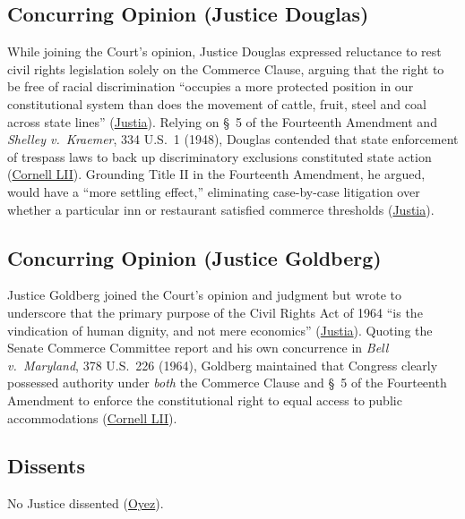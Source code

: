 \documentclass[12pt]{article}
\begin{document}
\subsection{Concurring Opinion (Justice Douglas)}
While joining the Court's opinion, Justice Douglas expressed reluctance to rest civil rights legislation solely on the Commerce Clause, arguing that the right to be free of racial discrimination ``occupies a more protected position in our constitutional system than does the movement of cattle, fruit, steel and coal across state lines'' (\href{https://supreme.justia.com/cases/federal/us/379/241/}{Justia}). Relying on \S~5 of the Fourteenth Amendment and \textit{Shelley v.\ Kraemer}, 334 U.S.\ 1 (1948), Douglas contended that state enforcement of trespass laws to back up discriminatory exclusions constituted state action (\href{https://www.law.cornell.edu/supremecourt/text/379/241}{Cornell LII}). Grounding Title II in the Fourteenth Amendment, he argued, would have a ``more settling effect,'' eliminating case-by-case litigation over whether a particular inn or restaurant satisfied commerce thresholds (\href{https://supreme.justia.com/cases/federal/us/379/241/}{Justia}).

\subsection{Concurring Opinion (Justice Goldberg)}
Justice Goldberg joined the Court's opinion and judgment but wrote to underscore that the primary purpose of the Civil Rights Act of 1964 ``is the vindication of human dignity, and not mere economics'' (\href{https://supreme.justia.com/cases/federal/us/379/241/}{Justia}). Quoting the Senate Commerce Committee report and his own concurrence in \textit{Bell v.\ Maryland}, 378 U.S.\ 226 (1964), Goldberg maintained that Congress clearly possessed authority under \textit{both} the Commerce Clause and \S~5 of the Fourteenth Amendment to enforce the constitutional right to equal access to public accommodations (\href{https://www.law.cornell.edu/supremecourt/text/379/241}{Cornell LII}).

\subsection{Dissents}
No Justice dissented (\href{https://www.oyez.org/cases/1964/515}{Oyez}).
\end{document}
